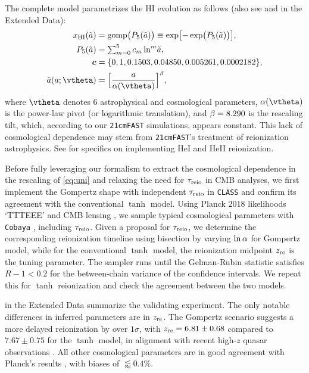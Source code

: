 The complete model parametrizes the HI evolution as follows (also see
 and  in the Extended Data):
%
\begin{align}
\label{eq:uni}
x_\HI(\ar) &= \gomp\bigl( P_5(\ar) \bigr)
  \equiv \exp\bigl[ - \exp\bigl( P_5(\ar) \bigr) \bigr], \\
%
\label{eq:poly}
P_5(\ar) &= {\textstyle\sum}_{m=0}^5 \, c_m \ln^m\!\ar, \\
%
\bm{c} &= \{0, 1, 0.1503, 0.04850, 0.005261, 0.0002182\}, \nonumber\\
%
\label{eq:map}
\ar(a; \vtheta) &= \Bigl[ \frac{a}{\ap(\vtheta)} \Bigr]^\tilt,
\end{align}
%
where $\vtheta$ denotes 6 astrophysical and cosmological parameters,
$\ap(\vtheta)$ is the power-law pivot (or logarithmic translation), and
$\beta = 8.290$ is the rescaling tilt, which, according to our
\texttt{21cmFAST} simulations, appears constant.
This lack of cosmological dependence may stem from \texttt{21cmFAST}'s
treatment of reionization astrophysics.
See  for specifics on implementing HeI and HeII
reionization.

Before fully leveraging our formalism to extract the cosmological
dependence in the rescaling of \cref{eq:uni} and relaxing the
need for $\tau_{\mathrm{reio}}$ in CMB analyses, we first implement the Gompertz
shape with independent $\tau_{\mathrm{reio}}$ in \texttt{CLASS} and confirm its
agreement with the conventional $\tanh$ model.
Using Planck 2018 likelihoods `TTTEEE' \cite{Planck2020c} and CMB
lensing \cite{Planck2020d}, we sample typical cosmological parameters
with \texttt{Cobaya} \cite{Torrado2020}, including $\tau_{\mathrm{reio}}$. Given a proposal for
$\tau_{\mathrm{reio}}$, we determine the corresponding reionization timeline using bisection by varying
$\ln\alpha$ for Gompertz model, while for the conventional $\tanh$ model,
the reionization midpoint $z_{\mathrm{re}}$ is the tuning parameter.
The sampler runs until the Gelman-Rubin statistic \cite{Gelman1992}
satisfies $R - 1 < 0.2$ for the between-chain variance of the confidence
intervals.
We repeat this for $\tanh$ reionization and check the agreement between the two models.

 in the Extended Data summarize the validating
experiment.
The only notable differences in inferred parameters are in $z_{\mathrm{re}}$.
The Gompertz scenario suggests a more delayed reionization by over
$1\sigma$, with $z_{\mathrm{re}} = 6.81 \pm 0.68$ compared to $7.67 \pm 0.75$ for
the $\tanh$ model, in alignment with recent high-$z$ quasar observations
\cite{Keating2020}.
All other cosmological parameters are in good agreement with Planck's
results \cite{Planck2020a}, with biases of $\lessapprox 0.4 \%$.

